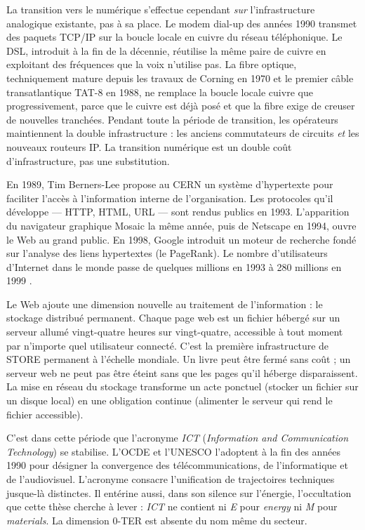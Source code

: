 La transition vers le numérique s'effectue cependant \emph{sur} l'infrastructure analogique existante, pas à sa place. Le modem dial-up des années 1990 transmet des paquets TCP/IP sur la boucle locale en cuivre du réseau téléphonique. Le DSL, introduit à la fin de la décennie, réutilise la même paire de cuivre en exploitant des fréquences que la voix n'utilise pas. La fibre optique, techniquement mature depuis les travaux de Corning en 1970 et le premier câble transatlantique TAT-8 en 1988, ne remplace la boucle locale cuivre que progressivement, parce que le cuivre est déjà posé et que la fibre exige de creuser de nouvelles tranchées. Pendant toute la période de transition, les opérateurs maintiennent la double infrastructure : les anciens commutateurs de circuits \emph{et} les nouveaux routeurs IP. La transition numérique est un double coût d'infrastructure, pas une substitution.
 
En 1989, Tim Berners-Lee propose au CERN un système d'hypertexte pour faciliter l'accès à l'information interne de l'organisation. Les protocoles qu'il développe --- HTTP, HTML, URL --- sont rendus publics en 1993. L'apparition du navigateur graphique Mosaic la même année, puis de Netscape en 1994, ouvre le Web au grand public. En 1998, Google introduit un moteur de recherche fondé sur l'analyse des liens hypertextes (le PageRank). Le nombre d'utilisateurs d'Internet dans le monde passe de quelques millions en 1993 à 280 millions en 1999 \parencite{abbate_inventing_1999}.
 
Le Web ajoute une dimension nouvelle au traitement de l'information : le stockage distribué permanent. Chaque page web est un fichier hébergé sur un serveur allumé vingt-quatre heures sur vingt-quatre, accessible à tout moment par n'importe quel utilisateur connecté. C'est la première infrastructure de STORE permanent à l'échelle mondiale. Un livre peut être fermé sans coût ; un serveur web ne peut pas être éteint sans que les pages qu'il héberge disparaissent. La mise en réseau du stockage transforme un acte ponctuel (stocker un fichier sur un disque local) en une obligation continue (alimenter le serveur qui rend le fichier accessible).
 
C'est dans cette période que l'acronyme \emph{ICT} (\emph{Information and Communication Technology}) se stabilise. L'OCDE et l'UNESCO l'adoptent à la fin des années 1990 pour désigner la convergence des télécommunications, de l'informatique et de l'audiovisuel. L'acronyme consacre l'unification de trajectoires techniques jusque-là distinctes. Il entérine aussi, dans son silence sur l'énergie, l'occultation que cette thèse cherche à lever : \emph{ICT} ne contient ni \emph{E} pour \emph{energy} ni \emph{M} pour \emph{materials}. La dimension 0-TER est absente du nom même du secteur.
 
